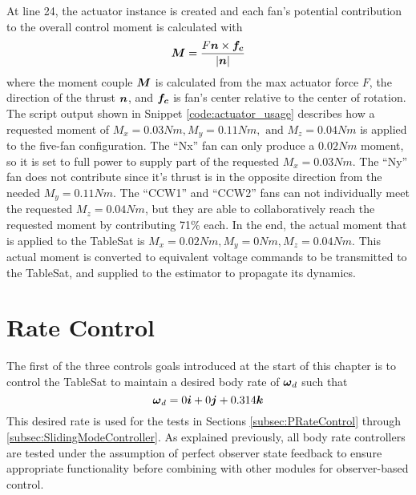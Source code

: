 At line 24, the actuator instance is created and each fan's potential contribution to the overall control moment is calculated with
\begin{equation}
  \boldsymbol{M} = \frac{F \boldsymbol{n} \times \boldsymbol{f_c}}{|\boldsymbol{n}|}
\end{equation}
where the moment couple $\boldsymbol{M}$ is calculated from the max actuator force $F$, the direction of the thrust $\boldsymbol{n}$, and $\boldsymbol{f_c}$ is fan's center relative to the center of rotation.
The script output shown in Snippet \ref{code:actuator_usage} describes how a requested moment of $M_x = 0.03Nm, M_y = 0.11Nm, \text{ and } M_z = 0.04Nm$ is applied to the five-fan configuration.  The ``Nx'' fan can only produce a $0.02Nm$ moment, so it is set to full power to supply part of the requested $M_x = 0.03Nm$.  The ``Ny'' fan does not contribute since it's thrust is in the opposite direction from the needed $M_y = 0.11Nm$.  The ``CCW1'' and ``CCW2'' fans can not individually meet the requested $M_z = 0.04Nm$, but they are able to collaboratively reach the requested moment by contributing 71\% each.  In the end, the actual moment that is applied to the TableSat is $M_x = 0.02Nm, M_y = 0Nm, M_z = 0.04Nm$.  This actual moment is converted to equivalent voltage commands to be transmitted to the TableSat, and supplied to the estimator to propagate its dynamics.

\section{Rate Control}
\label{sec:RateControl}

The first of the three controls goals introduced at the start of this chapter is to control the TableSat to maintain a desired body rate of $\boldsymbol{\omega}_d$ such that
\begin{equation}
  \boldsymbol{\omega}_d = 0 \boldsymbol{i} + 0 \boldsymbol{j} + 0.314 \boldsymbol{k}
\end{equation}
This desired rate is used for the tests in Sections \ref{subsec:PRateControl} through \ref{subsec:SlidingModeController}.  As explained previously, all body rate controllers are tested under the assumption of perfect observer state feedback to ensure appropriate functionality before combining with other modules for observer-based control.
